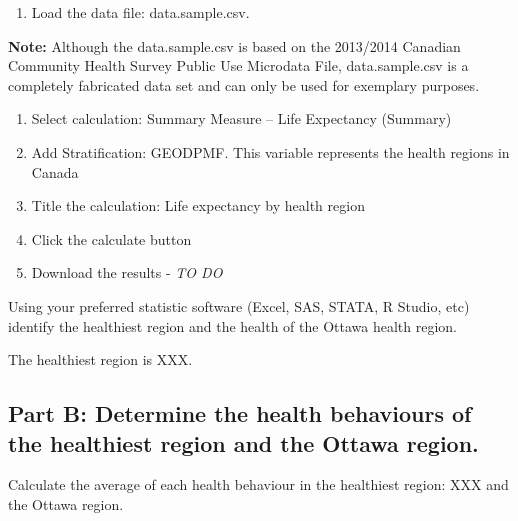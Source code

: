 \documentclass[]{book}
\providecommand{\tightlist}{%
  \setlength{\itemsep}{0pt}\setlength{\parskip}{0pt}}
\begin{document}
\begin{enumerate}
\def\labelenumi{\arabic{enumi}.}
\tightlist
\item
  Load the data file: data.sample.csv.
\end{enumerate}

\textbf{Note:} Although the data.sample.csv is based on the 2013/2014
Canadian Community Health Survey Public Use Microdata File,
data.sample.csv is a completely fabricated data set and can only be used
for exemplary purposes.

\begin{enumerate}
\def\labelenumi{\arabic{enumi}.}
\setcounter{enumi}{1}
\item
  Select calculation: Summary Measure -- Life Expectancy (Summary)
\item
  Add Stratification: GEODPMF. This variable represents the health
  regions in Canada
\item
  Title the calculation: Life expectancy by health region
\item
  Click the calculate button
\item
  Download the results - \emph{TO DO}
\end{enumerate}

Using your preferred statistic software (Excel, SAS, STATA, R Studio,
etc) identify the healthiest region and the health of the Ottawa health
region.

The healthiest region is XXX.

\subsection{Part B: Determine the health behaviours of the healthiest
region and the Ottawa
region.}\label{part-b-determine-the-health-behaviours-of-the-healthiest-region-and-the-ottawa-region.}

Calculate the average of each health behaviour in the healthiest region:
XXX and the Ottawa region.
\end{document}
